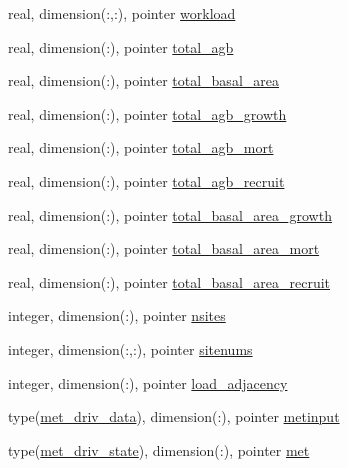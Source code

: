 \begin{DoxyCompactItemize}
\item 
real, dimension(\+:,\+:), pointer \hyperlink{structed__state__vars_1_1edtype_a71730af92d1a6ac06b1d742a445fb9e4}{workload}
\item 
real, dimension(\+:), pointer \hyperlink{structed__state__vars_1_1edtype_add949252f6c92bb0d3c0a4d9e6d630c5}{total\+\_\+agb}
\item 
real, dimension(\+:), pointer \hyperlink{structed__state__vars_1_1edtype_a9fb0914907863b44067a68092c5fe40c}{total\+\_\+basal\+\_\+area}
\item 
real, dimension(\+:), pointer \hyperlink{structed__state__vars_1_1edtype_af7d099aeecb5c88c6f48676c0036ae39}{total\+\_\+agb\+\_\+growth}
\item 
real, dimension(\+:), pointer \hyperlink{structed__state__vars_1_1edtype_a85eea48343c460b50abc304be6246ffc}{total\+\_\+agb\+\_\+mort}
\item 
real, dimension(\+:), pointer \hyperlink{structed__state__vars_1_1edtype_a02d21b125e29153458ca8b220e08f195}{total\+\_\+agb\+\_\+recruit}
\item 
real, dimension(\+:), pointer \hyperlink{structed__state__vars_1_1edtype_a97f5a920605760310ee33c03a98cc140}{total\+\_\+basal\+\_\+area\+\_\+growth}
\item 
real, dimension(\+:), pointer \hyperlink{structed__state__vars_1_1edtype_a7c983b0a35d385f040de24e8d1419a10}{total\+\_\+basal\+\_\+area\+\_\+mort}
\item 
real, dimension(\+:), pointer \hyperlink{structed__state__vars_1_1edtype_aeec477283ef8ab1d404c6777a83b3e88}{total\+\_\+basal\+\_\+area\+\_\+recruit}
\item 
integer, dimension(\+:), pointer \hyperlink{structed__state__vars_1_1edtype_a1ed17b81dc6e7a00cae6e63804a4130e}{nsites}
\item 
integer, dimension(\+:,\+:), pointer \hyperlink{structed__state__vars_1_1edtype_a6f9345871744a10eaac691f0bd215700}{sitenums}
\item 
integer, dimension(\+:), pointer \hyperlink{structed__state__vars_1_1edtype_a852c94c7e750529cadecd69b65b61f89}{load\+\_\+adjacency}
\item 
type(\hyperlink{structmet__driver__coms_1_1met__driv__data}{met\+\_\+driv\+\_\+data}), dimension(\+:), pointer \hyperlink{structed__state__vars_1_1edtype_a16f5faa13de6c918906b8fca733c4f6a}{metinput}
\item 
type(\hyperlink{structmet__driver__coms_1_1met__driv__state}{met\+\_\+driv\+\_\+state}), dimension(\+:), pointer \hyperlink{structed__state__vars_1_1edtype_af7dfd128007a24a8b5e36586a864a662}{met}

\end{DoxyCompactItemize}
